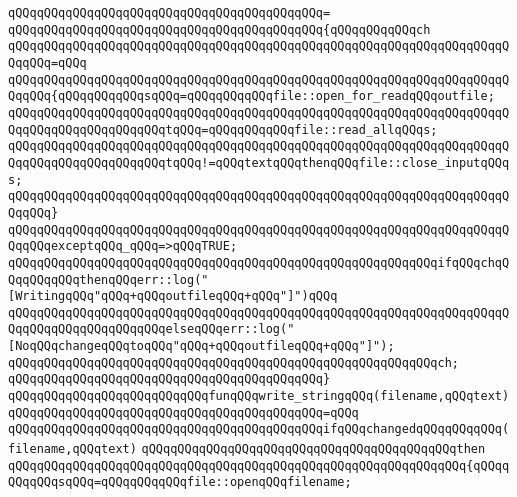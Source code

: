 \verb|qQQqqQQqqQQqqQQqqQQqqQQqqQQqqQQqqQQqqQQqqQQq=|\newline
\verb|qQQqqQQqqQQqqQQqqQQqqQQqqQQqqQQqqQQqqQQqqQQq{qQQqqQQqqQQqch|\newline
\verb|qQQqqQQqqQQqqQQqqQQqqQQqqQQqqQQqqQQqqQQqqQQqqQQqqQQqqQQqqQQqqQQqqQQqqQQqqQQq=qQQq|\newline
\verb|qQQqqQQqqQQqqQQqqQQqqQQqqQQqqQQqqQQqqQQqqQQqqQQqqQQqqQQqqQQqqQQqqQQqqQQqqQQq{qQQqqQQqqQQqsqQQq=qQQqqQQqqQQqfile::open_for_readqQQqoutfile;|\newline
\verb|qQQqqQQqqQQqqQQqqQQqqQQqqQQqqQQqqQQqqQQqqQQqqQQqqQQqqQQqqQQqqQQqqQQqqQQqqQQqqQQqqQQqqQQqqQQqtqQQq=qQQqqQQqqQQqfile::read_allqQQqs;|\newline
\newline
\verb|qQQqqQQqqQQqqQQqqQQqqQQqqQQqqQQqqQQqqQQqqQQqqQQqqQQqqQQqqQQqqQQqqQQqqQQqqQQqqQQqqQQqqQQqqQQqtqQQq!=qQQqtextqQQqthenqQQqfile::close_inputqQQqs;|\newline
\verb|qQQqqQQqqQQqqQQqqQQqqQQqqQQqqQQqqQQqqQQqqQQqqQQqqQQqqQQqqQQqqQQqqQQqqQQqqQQq}|\newline
\verb|qQQqqQQqqQQqqQQqqQQqqQQqqQQqqQQqqQQqqQQqqQQqqQQqqQQqqQQqqQQqqQQqqQQqqQQqqQQqexceptqQQq_qQQq=>qQQqTRUE;|\newline
\newline
\verb|qQQqqQQqqQQqqQQqqQQqqQQqqQQqqQQqqQQqqQQqqQQqqQQqqQQqqQQqqQQqifqQQqchqQQqqQQqqQQqthenqQQqerr::log("[WritingqQQq"qQQq+qQQqoutfileqQQq+qQQq"]")qQQq|\newline
\verb|qQQqqQQqqQQqqQQqqQQqqQQqqQQqqQQqqQQqqQQqqQQqqQQqqQQqqQQqqQQqqQQqqQQqqQQqqQQqqQQqqQQqqQQqqQQqelseqQQqerr::log("[NoqQQqchangeqQQqtoqQQq"qQQq+qQQqoutfileqQQq+qQQq"]");|\newline
\newline
\verb|qQQqqQQqqQQqqQQqqQQqqQQqqQQqqQQqqQQqqQQqqQQqqQQqqQQqqQQqqQQqch;|\newline
\verb|qQQqqQQqqQQqqQQqqQQqqQQqqQQqqQQqqQQqqQQqqQQq}|\newline
\newline
\verb|qQQqqQQqqQQqqQQqqQQqqQQqqQQqfunqQQqwrite_stringqQQq(filename,qQQqtext)|\newline
\verb|qQQqqQQqqQQqqQQqqQQqqQQqqQQqqQQqqQQqqQQqqQQq=qQQq|\newline
\verb|qQQqqQQqqQQqqQQqqQQqqQQqqQQqqQQqqQQqqQQqqQQqifqQQqchangedqQQqqQQqqQQq(filename,qQQqtext)|\newline
\verb|qQQqqQQqqQQqqQQqqQQqqQQqqQQqqQQqqQQqqQQqqQQqthen|\newline
\verb|qQQqqQQqqQQqqQQqqQQqqQQqqQQqqQQqqQQqqQQqqQQqqQQqqQQqqQQqqQQqqQQq{qQQqqQQqqQQqsqQQq=qQQqqQQqqQQqfile::openqQQqfilename;|\newline
